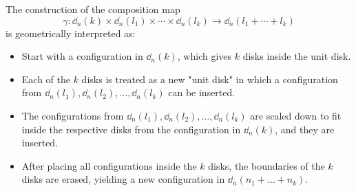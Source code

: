 \begin{egs}
\begin{enumerate}
            The construction of the composition map
            \[
            \gamma: \dd_n(k) \times \dd_n(l_1) \times \cdots \times \dd_n(l_k) \to \dd_n(l_1 + \cdots + l_k)
            \]
            is geometrically interpreted as:
            \begin{itemize}
                \item Start with a configuration in $\dd_n(k)$, which gives $k$
                disks inside the unit disk.
                \item Each of the $k$ disks is treated as a new "unit disk" in
                which a configuration from $\dd_n(l_1), \dd_n(l_2), \dots,
                \dd_n(l_k)$ can be inserted.
                \item The configurations from $\dd_n(l_1), \dd_n(l_2), \dots,
                \dd_n(l_k)$ are scaled down to fit inside the respective disks
                from the configuration in $\dd_n(k)$, and they are inserted.
                \item After placing all configurations inside the $k$ disks, the
                boundaries of the $k$ disks are erased, yielding a new
                configuration in $\dd_n(n_1 + \dots + n_k)$.
            \end{itemize}
            
            \begin{center}
\end{center}
\end{enumerate}
\end{egs}
